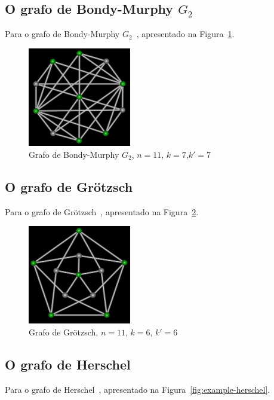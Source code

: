 \subsection{O grafo de Bondy-Murphy $G_2$}
Para o grafo de Bondy-Murphy $G_2$~\cite{cite:example-bondy},
apresentado na Figura~\ref{fig:example-bondymurphyg2}.

\begin{figure}[htb]
\centering
\includegraphics[width=0.4\textwidth]{img/bondymurphyg2.png}
\caption{Grafo de Bondy-Murphy $G_2$, $n=11$, $k=7$,$k'=7$}
\label{fig:example-bondymurphyg2}
\end{figure}


\subsection{O grafo de Grötzsch}
Para o grafo de Grötzsch~\cite{cite:example-grotzsch},
apresentado na Figura~\ref{fig:example-grotzsch}.

\begin{figure}[htb]
\centering
\includegraphics[width=0.4\textwidth]{img/grotzsch.png}
\caption{Grafo de Grötzsch, $n=11$, $k=6$, $k'=6$}
\label{fig:example-grotzsch}
\end{figure}


\subsection{O grafo de Herschel}
Para o grafo de Herschel~\cite{cite:example-herschel},
apresentado na Figura~\ref{fig:example-herschel}.

